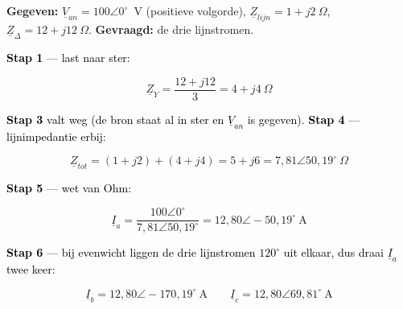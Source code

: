 \documentclass[a4paper,11pt]{article}
\newcommand{\stapreden}[1]{\par\vspace{1.4mm}\noindent\textcolor{black}{#1}\par\vspace{-2mm}}
\begin{document}
\begin{oefenblok}
    \textbf{Gegeven:} $\underline{V}_{an} = 100\angle 0^\circ$~V (positieve volgorde),
    $\underline{Z}_{lijn} = 1 + j2\ \Omega$, $\underline{Z}_\Delta = 12 + j12\ \Omega$.
    \textbf{Gevraagd:} de drie lijnstromen.

    \stapreden{\textbf{Stap 1} --- last naar ster:}
    \[\underline{Z}_Y = \frac{12+j12}{3} = 4 + j4\ \Omega\]

    \stapreden{\textbf{Stap 3} valt weg (de bron staat al in ster en $\underline{V}_{an}$ is gegeven). \textbf{Stap 4} --- lijnimpedantie erbij:}
    \[\underline{Z}_{tot} = (1+j2) + (4+j4) = 5 + j6 = 7{,}81\angle 50{,}19^\circ\ \Omega\]

    \stapreden{\textbf{Stap 5} --- wet van Ohm:}
    \[\underline{I}_a = \frac{100\angle 0^\circ}{7{,}81\angle 50{,}19^\circ}
        = \boxed{12{,}80\angle -50{,}19^\circ\ \text{A}}\]

    \stapreden{\textbf{Stap 6} --- bij evenwicht liggen de drie lijnstromen $120^\circ$ uit elkaar,
        dus draai $\underline{I}_a$ twee keer:}
    \[\underline{I}_b = \boxed{12{,}80\angle -170{,}19^\circ\ \text{A}}
        \qquad
        \underline{I}_c = \boxed{12{,}80\angle 69{,}81^\circ\ \text{A}}\]
\end{oefenblok}
\end{document}
